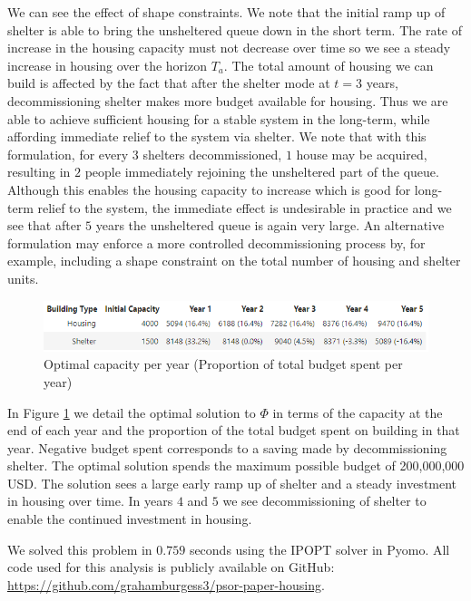 \documentclass[12pt,a4paper]{article}
\begin{document}
We can see the effect of shape constraints. We note that the initial ramp up of shelter is able to bring the unsheltered queue down in the short term. The rate of increase in the housing capacity must not decrease over time so we see a steady increase in housing over the horizon $T_a$. The total amount of housing we can build is affected by the fact that after the shelter mode at $t=3$ years, decommissioning shelter makes more budget available for housing. Thus we are able to achieve sufficient housing for a stable system in the long-term, while affording immediate relief to the system via shelter. We note that with this formulation, for every $3$ shelters decommissioned, $1$ house may be acquired, resulting in $2$ people immediately rejoining the unsheltered part of the queue. Although this enables the housing capacity to increase which is good for long-term relief to the system, the immediate effect is undesirable in practice and we see that after $5$ years the unsheltered queue is again very large. An alternative formulation may enforce a more controlled decommissioning process by, for example, including a shape constraint on the total number of housing and shelter units.      
\begin{figure}[h!]
    \centering
    \includegraphics[scale=0.8]{results_comparison.png}
    \caption{Optimal capacity per year (Proportion of total budget spent per year)}
    \label{tab:phi1phi2results}
\end{figure}

In Figure \ref{tab:phi1phi2results} we detail the optimal solution to $\Phi$ in terms of the capacity at the end of each year and the proportion of the total budget spent on building in that year. Negative budget spent corresponds to a saving made by decommissioning shelter. The optimal solution spends the maximum possible budget of 200,000,000 USD. The solution sees a large early ramp up of shelter and a steady investment in housing over time. In years $4$ and $5$ we see decommissioning of shelter to enable the continued investment in housing. 

We solved this problem in $0.759$ seconds using the IPOPT solver in Pyomo. All code used for this analysis is publicly available on GitHub: \url{https://github.com/grahamburgess3/psor-paper-housing}.
\end{document}
